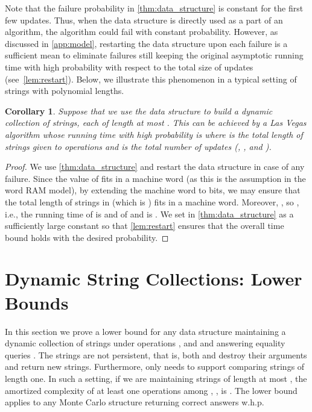 \documentclass[a4paper]{article}
\newtheorem{corollary}[theorem]{Corollary}
\theoremstyle{remark}
\begin{document}
Note that the failure probability in \cref{thm:data_structure} is constant for the first few updates. 
Thus, when the data structure is directly used as a part of an algorithm, the algorithm could fail with constant probability.
However, as discussed in \cref{app:model}, restarting the data structure upon each failure is a sufficient mean to eliminate failures 
still keeping the original asymptotic running time with high probability with respect to the total size of updates (see~\cref{lem:restart}).
Below, we illustrate this phenomenon in a typical setting of strings with polynomial lengths.

\begin{corollary}\label{cor:persistent}
Suppose that we use the data structure to build  a dynamic collection of  strings, each of length at most .
This can be achieved by a Las Vegas algorithm whose running time with high probability is  where 
is the total length of strings given to  operations and  is the total number of updates (, , and ).
\end{corollary}

\begin{proof}
We use \cref{thm:data_structure} and restart the data structure in case of any failure.
Since the value of  fits in a machine word (as this is the assumption in the word RAM model),
by extending the machine word to  bits, we may ensure that the total length of strings in  (which is )
fits in a machine word.  Moreover, , so , i.e., the running time of  is 
and of  and  is .
We set  in \cref{thm:data_structure} as a sufficiently large constant
so that \cref{lem:restart} ensures that the overall time bound holds with the desired probability.
\end{proof}

\section{Dynamic String Collections: Lower Bounds}\label{sec:lb}

In this section we prove a lower bound for any data structure maintaining a dynamic collection
of strings under operations ,  and  and
answering equality queries . The strings are not persistent, that is, both 
and  destroy their arguments and return new strings. Furthermore,
 only needs to support comparing strings of length one.
In such a setting, if we are maintaining  strings of length at most ,
the amortized complexity of at least one operations among , ,  is
. The lower bound applies to any Monte Carlo structure returning correct answers
w.h.p.
\end{document}
